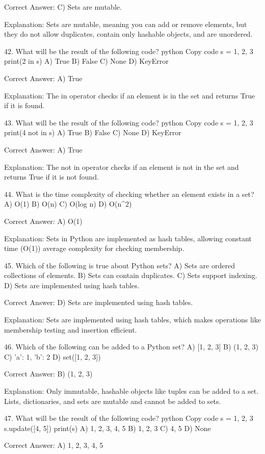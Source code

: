 Correct Answer: C) Sets are mutable.

Explanation:
Sets are mutable, meaning you can add or remove elements, but they do not allow duplicates, contain only hashable objects, and are unordered.

42. What will be the result of the following code?
python
Copy code
s = {1, 2, 3}
print(2 in s)
A) True
B) False
C) None
D) KeyError

Correct Answer: A) True

Explanation:
The in operator checks if an element is in the set and returns True if it is found.

43. What will be the result of the following code?
python
Copy code
s = {1, 2, 3}
print(4 not in s)
A) True
B) False
C) None
D) KeyError

Correct Answer: A) True

Explanation:
The not in operator checks if an element is not in the set and returns True if it is not found.

44. What is the time complexity of checking whether an element exists in a set?
A) O(1)
B) O(n)
C) O(log n)
D) O(n^2)

Correct Answer: A) O(1)

Explanation:
Sets in Python are implemented as hash tables, allowing constant time (O(1)) average complexity for checking membership.

45. Which of the following is true about Python sets?
A) Sets are ordered collections of elements.
B) Sets can contain duplicates.
C) Sets support indexing.
D) Sets are implemented using hash tables.

Correct Answer: D) Sets are implemented using hash tables.

Explanation:
Sets are implemented using hash tables, which makes operations like membership testing and insertion efficient.

46. Which of the following can be added to a Python set?
A) [1, 2, 3]
B) (1, 2, 3)
C) {'a': 1, 'b': 2}
D) set([1, 2, 3])

Correct Answer: B) (1, 2, 3)

Explanation:
Only immutable, hashable objects like tuples can be added to a set. Lists, dictionaries, and sets are mutable and cannot be added to sets.

47. What will be the result of the following code?
python
Copy code
s = {1, 2, 3}
s.update([4, 5])
print(s)
A) {1, 2, 3, 4, 5}
B) {1, 2, 3}
C) {4, 5}
D) None

Correct Answer: A) {1, 2, 3, 4, 5}

